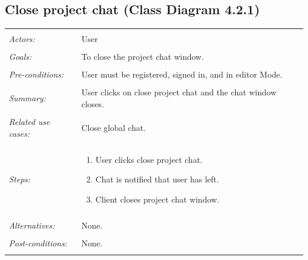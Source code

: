 \documentclass[11pt]{report}
\begin{document}
\subsection{Close project chat (Class Diagram 4.2.1)}
\begin{tabular}{ p{2cm} p{12cm} }
 \hline
 \\
 \textit{Actors:} & User \\ 
 \\
 \textit{Goals:} & To close the project chat window. \\
 \\
 \textit{Pre-conditions:} & User must be registered, signed in, and in editor Mode.  \\
 \\
 \textit{Summary:} & User clicks on close project chat and the chat window closes. \\ 
 \\
 \textit{Related use cases:} & Close global chat. \\ 
 \\
 \textit{Steps:} & \begin{enumerate}
  \item User clicks close project chat.
  \item Chat is notified that user has left.
  \item Client closes project chat window.
 \end{enumerate} \\
 \\
 \textit{Alternatives:} & None. \\
 \\
 \textit{Post-conditions:} & None. \\
 \\
\hline
\end{tabular}
\end{document}
